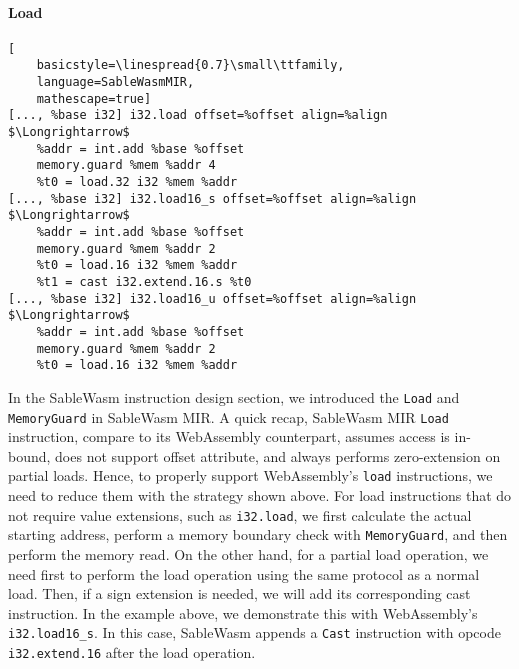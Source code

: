 \paragraph{Load} \quad
\begin{lstlisting}[
    basicstyle=\linespread{0.7}\small\ttfamily, 
    language=SableWasmMIR, 
    mathescape=true]
[..., %base i32] i32.load offset=%offset align=%align $\Longrightarrow$
    %addr = int.add %base %offset
    memory.guard %mem %addr 4
    %t0 = load.32 i32 %mem %addr
[..., %base i32] i32.load16_s offset=%offset align=%align $\Longrightarrow$
    %addr = int.add %base %offset
    memory.guard %mem %addr 2
    %t0 = load.16 i32 %mem %addr
    %t1 = cast i32.extend.16.s %t0
[..., %base i32] i32.load16_u offset=%offset align=%align $\Longrightarrow$
    %addr = int.add %base %offset
    memory.guard %mem %addr 2
    %t0 = load.16 i32 %mem %addr
\end{lstlisting}
In the SableWasm instruction design section, we introduced the \texttt{Load} and
\texttt{MemoryGuard} in SableWasm MIR. A quick recap, SableWasm MIR
\texttt{Load} instruction, compare to its WebAssembly counterpart, assumes
access is in-bound, does not support offset attribute, and always performs
zero-extension on partial loads. Hence, to properly support WebAssembly's
\texttt{load} instructions, we need to reduce them with the strategy shown
above. For load instructions that do not require value extensions, such as
\texttt{i32.load}, we first calculate the actual starting address, perform a
memory boundary check with \texttt{MemoryGuard}, and then perform the memory
read. On the other hand, for a partial load operation, we need first to perform
the load operation using the same protocol as a normal load. Then, if a sign
extension is needed, we will add its corresponding cast instruction. In the
example above, we demonstrate this with WebAssembly's \texttt{i32.load16\_s}.
In this case, SableWasm appends a \texttt{Cast} instruction with opcode
\texttt{i32.extend.16} after the load operation.

